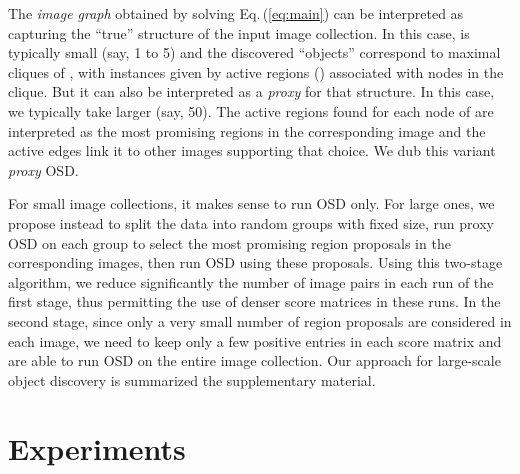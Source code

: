 \documentclass[runningheads]{llncs}
\begin{document}
The {\em image graph}  obtained by solving
Eq.\,(\ref{eq:main}) can be interpreted as capturing the ``true'' structure of the input image collection. In this case,  is typically small (say, 1 to 5) and the discovered ``objects'' correspond to maximal cliques of , with instances given by active regions () associated with nodes in the clique. But it can also be interpreted as a {\em proxy} for that structure. In this case, we typically take  larger (say, 50). The active regions found for each node  of  are interpreted as the most promising regions in the corresponding image and the active edges  link it to other images supporting that choice. We dub this variant {\em proxy} OSD.

For small image collections, it makes sense to run OSD only. For large ones, we propose instead to split the data into random groups with fixed size, run proxy OSD on each group to select the most promising region proposals in the corresponding images, then run OSD using these proposals. Using this two-stage algorithm, we reduce significantly the number of image pairs in each run of the first stage, thus permitting the use of denser score matrices in these runs. In the second stage, since only a very small number of region proposals are considered in each image, we need to keep only a few positive entries in each score matrix and are able to run OSD on the entire image collection. Our approach for large-scale object discovery is summarized the supplementary material.

\section{Experiments}
\label{sec:experiments}
\end{document}
